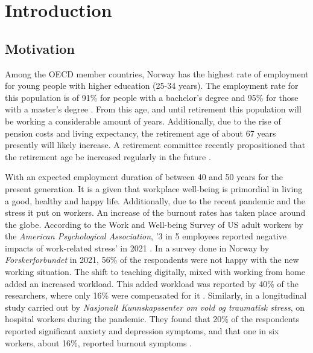 \chapter{Introduction}


\section{Motivation}
Among the OECD member countries, Norway has the highest rate of employment for young people with higher education (25-34 years). The employment rate for this population is of 91\% for people with a bachelor's degree and 95\% for those with a master's degree \parencite{fazli_hoy_2022}. From this age, and until retirement this population will be working a considerable amount of years. Additionally, due to the rise of pension costs and living expectancy, the retirement age of about 67 years presently \parencite{noauthor_pensjonsalder_nodate} will likely increase. A retirement committee recently propositioned that the retirement age be increased regularly in the future \parencite{haugan_pensjonsutvalget_2022}.

With an expected employment duration of between 40 and 50 years for the present generation. It is a given that workplace well-being is primordial in living a good, healthy and happy life. Additionally, due to the recent pandemic and the stress it put on workers. An increase of the burnout rates has taken place around the globe. According to the Work and Well-being Survey of US adult workers by the \textit{American Psychological Association}, '3 in 5 employees reported negative impacts of work-related stress' in 2021 \parencite{abramson_burnout_2022}. In a survey done in Norway by \textit{Forskerforbundet} in 2021, 56\% of the respondents were not happy with the new working situation. The shift to teaching digitally, mixed with working from home added an increased workload. This added workload was reported by 40\% of the researchers, where only 16\% were compensated for it \parencite{svarstad_tarene_2021}. Similarly, in a longitudinal study carried out by \textit{Nasjonalt Kunnskapssenter om vold og traumatisk stress}, on hospital workers during the pandemic. They found that 20\% of the respondents reported significant anxiety and depression symptoms, and that one in six workers, about 16\%, reported burnout symptoms \parencite{noauthor_studie_2022}.

